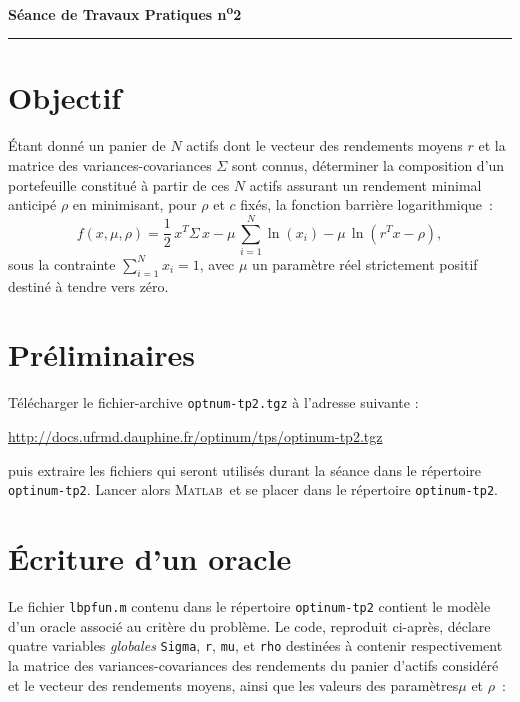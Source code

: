 \documentclass[10pt,a4paper,fleqn]{report}
\makeatletter
\def\cleardoublepage{\clearpage\if@twoside\ifodd\c@page\else\hbox{}\thispagestyle{empty}\newpage\fi\fi}
\newcommand{\matlab}{\textsc{Matlab}}
\renewcommand{\tt}{\texttt}
\makeatother
\begin{document}
\cleardoublepage



\begin{center}

\textbf{\huge S\'{e}ance de Travaux Pratiques  n\textsuperscript{o}2}

\smallskip

\rule{10cm}{0.4pt}

\end{center}


\section*{Objectif}
\'Etant donn\'e un panier de $N$ actifs dont le vecteur des rendements moyens $r$ et la matrice des variances-covariances $\Sigma$ sont connus, d\'eterminer la composition d'un portefeuille constitu\'e \`a partir de ces $N$ actifs assurant un rendement minimal anticip\'e $\rho$ en minimisant, pour $\rho$ et $c$ fix\'es, la fonction barri\`ere logarithmique~:
\[
f(x,\mu,\rho)=\frac{1}{2}\,x^T\Sigma\,x-\mu\,\sum_{i=1}^N\ln(x_i)-\mu\,\ln\left(r^Tx-\rho\right),
\]
sous la contrainte $\sum_{i=1}^N x_i=1$, avec $\mu$ un param\`etre r\'eel strictement positif destin\'e \`a tendre vers z\'ero.


\section{Pr\'{e}liminaires}
T\'{e}l\'{e}charger le fichier-archive \tt{optnum-tp2.tgz} \`{a} l'adresse suivante :

\centerline{\url{http://docs.ufrmd.dauphine.fr/optinum/tps/optinum-tp2.tgz}}
puis extraire les fichiers qui seront utilis\'{e}s durant la s\'{e}ance dans le r\'{e}pertoire
\tt{optinum-tp2}. Lancer alors \matlab\ et se placer dans le r\'{e}pertoire \tt{optinum-tp2}.

\section{\'Ecriture d'un oracle}

Le fichier \texttt{lbpfun.m} contenu dans le répertoire \tt{optinum-tp2} contient le modèle d'un oracle associé au critère du problème. Le code, reproduit ci-après,  déclare quatre variables \textit{globales} \tt{Sigma}, \tt r, \tt{mu}, et \tt{rho} destin\'ees \`a contenir respectivement la matrice des variances-covariances des rendements du panier d'actifs consid\'er\'e et le vecteur des rendements moyens, ainsi que les valeurs des paramètres$\mu$ et $\rho$~:
\end{document}
